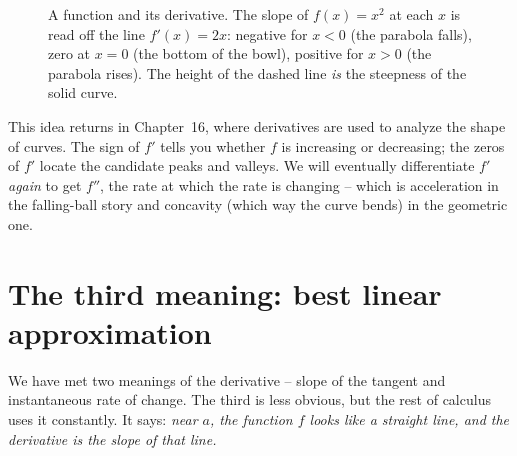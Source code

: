 \begin{figure}[htbp]
\centering
{}
\caption{A function and its derivative. The slope of $f(x)=x^2$ at each $x$ is
read off the line $f'(x)=2x$: negative for $x<0$ (the parabola falls), zero at
$x=0$ (the bottom of the bowl), positive for $x>0$ (the parabola rises). The
height of the dashed line \emph{is} the steepness of the solid curve.}
\label{ch10:fig-f-and-fprime}
\end{figure}

\begin{connectionbox}
This idea returns in Chapter~16, where derivatives are used to analyze the
shape of curves. The sign of $f'$ tells you whether $f$ is increasing or decreasing;
the zeros of $f'$ locate the candidate peaks and valleys. We will eventually
differentiate $f'$ \emph{again} to get $f''$, the rate at which the rate is
changing -- which is acceleration in the falling-ball story and concavity
(which way the curve bends) in the geometric one.
\end{connectionbox}

\section{The third meaning: best linear approximation}
\label{ch10:best-linear}

We have met two meanings of the derivative -- slope of the tangent and
instantaneous rate of change. The third is less obvious, but the rest of
calculus uses it constantly. It says: \emph{near $a$, the function $f$ looks
like a straight line, and the derivative is the slope of that line.}

